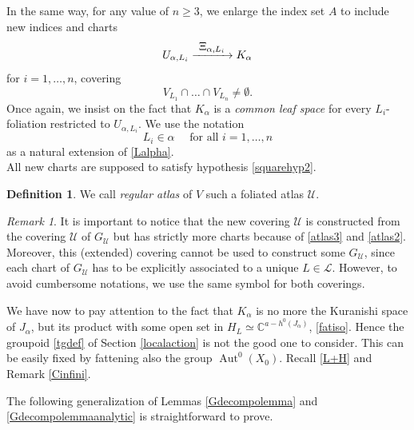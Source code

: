 \documentclass[JEP,XML,SOM,Unicode]{cedram}
\let\mathcal\mathscr
\def\To#1{\mathchoice{\xrightarrow{\textstyle\kern4pt#1\kern3pt}}{\stackrel{#1}{\longrightarrow}}{}{}}
\DeclareMathOperator{\Aut}{Aut}
\theoremstyle{plain}
\theoremstyle{definition}
\newtheorem{definition}[theorem]{Definition}
\theoremstyle{remark}
\newtheorem{remark}[theorem]{Remark}
\numberwithin{equation}{section}
\newcommand{\CC}{{\mathbb{C}}}
\newcommand{\Azero}{\Aut^0(X_0)}
\begin{document}
In the same way, for any value of $n\geq 3$, we enlarge the index set $A$ to include new indices and charts
\begin{equation}
\label{atlas3}
U_{\alpha, L_i}\To{\Xi_{\alpha, L_i}}K_{\alpha}
\end{equation}
for $i=1,\hdots, n$, covering
\begin{equation}
\label{inter2}
V_{L_1}\cap\hdots\cap V_{L_n}\not =\emptyset.
\end{equation}
Once again, we insist on the fact that $K_{\alpha}$ is a \emph{common leaf space} for every $L_i$-foliation restricted to $U_{\alpha,L_i}$.
We use the notation
\begin{equation}
\label{Lialpha}
L_i\in\alpha\quad\text{ for all } i=1,\hdots, n
\end{equation}
as a natural extension of \eqref{Lalpha}.
\medskip\\
All new charts are supposed to satisfy hypothesis \ref{squarehyp2}.

\begin{definition}
\label{regatlasdef}
We call \emph{regular atlas} of $V$ such a foliated atlas $\mathcal U$.
\end{definition}

\begin{remark}
\label{atlases}
It is important to notice that the new covering $\mathcal U$ is constructed from the covering $\mathcal U$ of $G_{\mathcal U}$ but has strictly more charts because of \eqref{atlas3} and \eqref{atlas2}. Moreover, this (extended) covering cannot be used to construct some $G_{\mathcal U}$, since each chart of $G_{\mathcal U}$ has to be explicitly associated to a unique $L\in\mathcal L$. However, to avoid cumbersome notations, we use the same symbol for both coverings.
\end{remark}

We have now to pay attention to the fact that $K_\alpha$ is no more the Kuranishi space of $J_\alpha$, but its product with some open set in $H_L\simeq\CC^{a-h^0(J_\alpha)}$, \cf \eqref{fatiso}. Hence the groupoid \eqref{tgdef} of Section \ref{localaction} is not the good one to consider. This can be easily fixed by fattening also the group $\Azero$. Recall \eqref{L+H} and Remark \ref{Cinfini}.

The following generalization of Lemmas \ref{Gdecompolemma} and \ref{Gdecompolemmaanalytic} is straightforward to prove.
\end{document}
